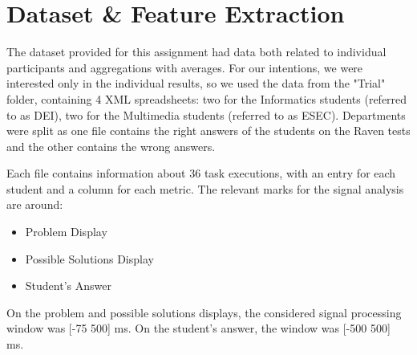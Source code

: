 \documentclass[extendedabs]{recpad2k}
\begin{document}


\section{Dataset \& Feature Extraction}

The dataset provided for this assignment had data both related to individual participants and aggregations with averages.
For our intentions, we were interested only in the individual results, so we used the data from the "Trial" folder, containing 4 XML spreadsheets: two for the 
Informatics students (referred to as DEI), two for the Multimedia students (referred to as ESEC).
Departments were split as one file contains the right answers of the students on the Raven tests and the other contains the wrong answers.

Each file contains information about 36 task executions, with an entry for each student and a column for each metric. 
The relevant marks for the signal analysis are around: 
\begin{itemize}[noitemsep,nolistsep]
\item Problem Display
\item Possible Solutions Display
\item Student's Answer
\end{itemize}
\vspace{2pt}
On the problem and possible solutions displays, the considered signal processing window was [-75 500] ms.
On the student's answer, the window was [-500 500] ms.
\end{document}
